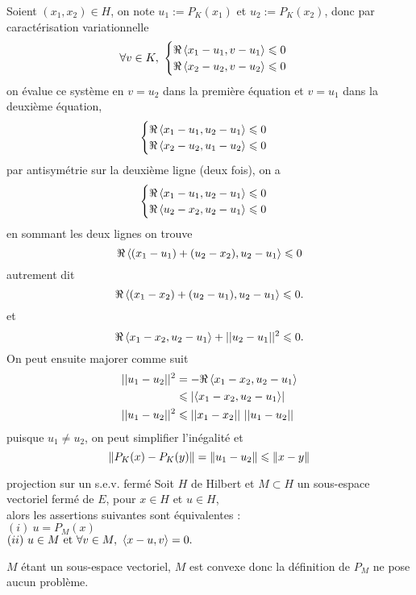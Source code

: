 \documentclass[a4paper,11pt, twoside]{article}
\begin{document}
\begin{Proof}
  Soient $(x_1,x_2)\in H$, on note $u_1:=P_K(x_1)$ et $u_2:=P_K(x_2)$, donc par caractérisation variationnelle
  $$\forall v\in K,\ \begin{cases}
    \Re\left\langle x_1-u_1,v-u_1 \right\rangle\leqslant 0\\
    \Re\left\langle x_2-u_2,v-u_2 \right\rangle\leqslant 0\\
  \end{cases}$$
  on évalue ce système en $v=u_2$ dans la première équation et $v=u_1$ dans la deuxième équation,
  $$\begin{cases}
    \Re\left\langle x_1-u_1,u_2-u_1 \right\rangle\leqslant 0\\
    \Re\left\langle x_2-u_2,u_1-u_2 \right\rangle\leqslant 0\\
  \end{cases}$$
  par antisymétrie sur la deuxième ligne (deux fois), on a
  $$\begin{cases}
    \Re\left\langle x_1-u_1,u_2-u_1 \right\rangle\leqslant 0\\
    \Re\left\langle u_2-x_2,u_2-u_1 \right\rangle\leqslant 0\\
  \end{cases}$$
  en sommant les deux lignes on trouve 
  $$\Re\left\langle (x_1-u_1)+(u_2-x_2),u_2-u_1 \right\rangle\leqslant 0$$
  autrement dit
  $$\Re\left\langle (x_1-x_2)+(u_2-u_1),u_2-u_1 \right\rangle\leqslant 0.$$
  et 
  $$\Re\left\langle x_1-x_2,u_2-u_1 \right\rangle+||u_2-u_1||^2\leqslant 0.$$
  On peut ensuite majorer comme suit
  \begin{align*}
    ||u_1-u_2||^2&=-\Re\left\langle x_1-x_2,u_2-u_1 \right\rangle\\
    &\leqslant \left| \left\langle x_1-x_2,u_2-u_1 \right\rangle\right|\\
    ||u_1-u_2||^2&\leqslant ||x_1-x_2||\ ||u_1-u_2||
  \end{align*}
  puisque $u_1\neq u_2$, on peut simplifier l'inégalité et 
  $$\left\lVert P_K(x)-P_K(y)\right\rVert=\left\lVert u_1-u_2\right\rVert\leqslant\left\lVert x-y\right\rVert$$
\end{Proof}



\begin{propC}{projection sur un s.e.v. fermé}
  Soit $H$ de Hilbert et $M\subset H$ un sous-espace vectoriel fermé de $E$, pour $x\in H$ et $u\in H$,\\

  alors les assertions suivantes sont équivalentes :\\
  $(i)\ u=P_M(x)$\\
  $(ii)\ u\in M\text{ et }\forall v\in M,\ \ps{x-u,v}=0.$
\end{propC}


\begin{RQ}
  $M$ étant un sous-espace vectoriel, $M$ est convexe donc la définition de $P_M$ ne pose aucun problème.
\end{RQ}
\end{document}
